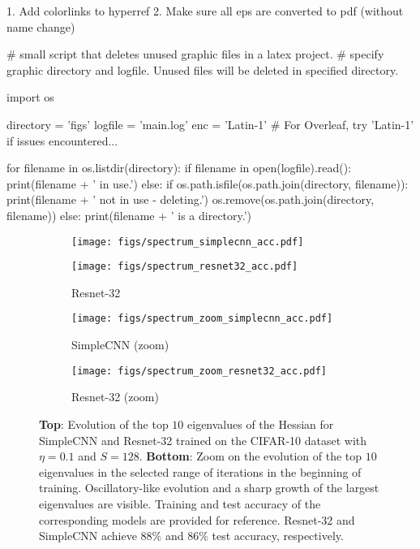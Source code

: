 
1. Add colorlinks to hyperref
2. Make sure all eps are converted to pdf (without name change)


# small script that deletes unused graphic files in a latex project.
# specify graphic directory and logfile. Unused files will be deleted in specified directory.

import os

directory = 'figs'
logfile = 'main.log'
enc = 'Latin-1' # For Overleaf, try 'Latin-1' if issues encountered...

for filename in os.listdir(directory):
    if filename in open(logfile).read():
        print(filename + ' in use.')
    else:
        if os.path.isfile(os.path.join(directory, filename)):
            print(filename + ' not in use - deleting.')
            os.remove(os.path.join(directory, filename))
        else:
            print(filename + ' is a directory.')


\begin{figure}
\centering
\begin{subfigure}[t]{0.49\linewidth}
\texttt{[image: figs/spectrum\_simplecnn\_acc.pdf]}
\end{subfigure}%
\begin{subfigure}[t]{0.49\linewidth}
\texttt{[image: figs/spectrum\_resnet32\_acc.pdf]}
\caption{Resnet-32}
\end{subfigure}
\begin{subfigure}[t]{0.49\linewidth}
\texttt{[image: figs/spectrum\_zoom\_simplecnn\_acc.pdf]}
 \caption{SimpleCNN (zoom)}
\end{subfigure}%
\begin{subfigure}[t]{0.49\linewidth}
\texttt{[image: figs/spectrum\_zoom\_resnet32\_acc.pdf]}
\caption{Resnet-32 (zoom)}
\end{subfigure}
\caption{\textbf{Top}: Evolution of the top $10$ eigenvalues of the Hessian for SimpleCNN and Resnet-32 trained on the CIFAR-10 dataset with $\eta=0.1$ and $S=128$. \textbf{Bottom}: Zoom on the evolution of the top $10$ eigenvalues in the selected range of iterations in the beginning of training. Oscillatory-like evolution and a sharp growth of the largest eigenvalues are visible. Training and test accuracy of the corresponding models are provided for reference. Resnet-32  and SimpleCNN achieve $88\%$ and $86\%$ test accuracy, respectively.}
\label{fig:largesteigenvalues}
\end{figure}